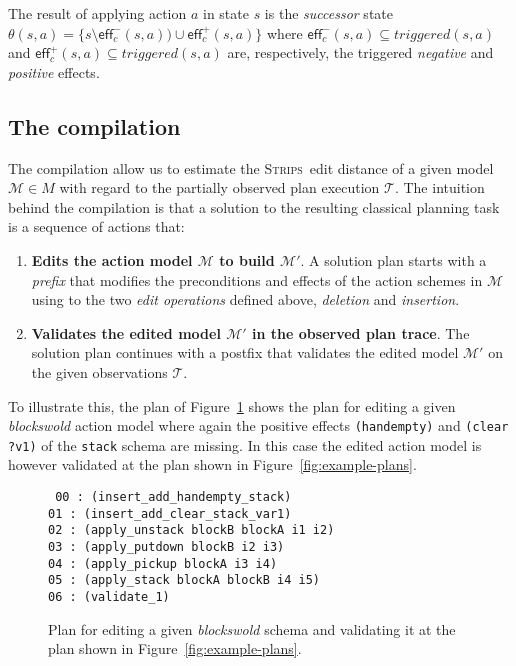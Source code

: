 \documentclass[letterpaper]{article} %
\newcommand{\eff}{\mathsf{eff}}     %
\newcommand{\strips}{\textsc{Strips}}     %
\begin{document}
The result of applying action $a$ in state $s$ is the {\em successor} state $\theta(s,a)=\{s\setminus\eff_c^-(s,a))\cup\eff_c^+(s,a)\}$ where $\eff_c^-(s,a)\subseteq triggered(s,a)$ and $\eff_c^+(s,a)\subseteq triggered(s,a)$ are, respectively, the triggered {\em negative} and {\em positive} effects.


\subsection{The compilation}
The compilation allow us to estimate the \strips\ edit distance of a given model $\mathcal{M}\in M$ with regard to the partially observed plan execution $\mathcal{T}$. The intuition behind the compilation is that a solution to the resulting classical planning task is a sequence of actions that:

\begin{enumerate}
\item {\bf Edits the action model $\mathcal{M}$ to build $\mathcal{M}'$}. A solution plan starts with a {\em prefix} that modifies the preconditions and effects of the action schemes in $\mathcal{M}$ using to the two {\em edit operations} defined above, {\em deletion} and {\em insertion}. 
\item {\bf Validates the edited model $\mathcal{M}'$ in the observed plan trace}. The solution plan continues with a postfix that validates the edited model $\mathcal{M}'$ on the given observations $\mathcal{T}$.
\end{enumerate}

To illustrate this, the plan of Figure~\ref{fig:plan-pdistance} shows the plan for editing a given {\em blockswold} action model where again the positive effects {\tt\small (handempty)} and {\tt\small (clear ?v1)} of the {\tt\small stack} schema are missing. In this case the edited action model is however validated at the plan shown in Figure~\ref{fig:example-plans}.

\begin{figure}[hbt!]
{\tt\scriptsize
00 : (insert\_add\_handempty\_stack)\\
01 : (insert\_add\_clear\_stack\_var1)\\
02 : (apply\_unstack blockB blockA i1 i2)\\
03 : (apply\_putdown blockB i2 i3)\\
04 : (apply\_pickup blockA i3 i4)\\
05 : (apply\_stack blockA blockB i4 i5)\\
06 : (validate\_1)
}
 \caption{\small Plan for editing a given {\em blockswold} schema and validating it at the plan shown in Figure~\ref{fig:example-plans}.}
\label{fig:plan-pdistance}
\end{figure}
\end{document}
